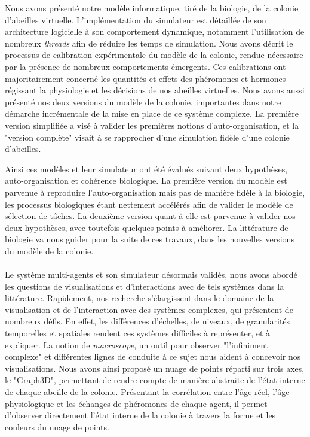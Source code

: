 Nous avons présenté notre modèle informatique, tiré de la biologie, de la colonie d'abeilles virtuelle. L'implémentation du simulateur est détaillée de son architecture logicielle à son comportement dynamique, notamment l'utilisation de nombreux \textit{threads} afin de réduire les temps de simulation. Nous avons décrit le processus de calibration expérimentale du modèle de la colonie, rendue nécessaire par la présence de nombreux comportements émergents. Ces calibrations ont majoritairement concerné les quantités et effets des phéromones et hormones régissant la physiologie et les décisions de nos abeilles virtuelles. Nous avons aussi présenté nos deux versions du modèle de la colonie, importantes dans notre démarche incrémentale de la mise en place de ce système complexe. La première version simplifiée a visé à valider les premières notions d'auto-organisation, et la "version complète" visait à se rapprocher d'une simulation fidèle d'une colonie d'abeilles.

Ainsi ces modèles et leur simulateur ont été évalués suivant deux hypothèses, auto-organisation et cohérence biologique. La première version du modèle est parvenue à reproduire l'auto-organisation mais pas de manière fidèle à la biologie, les processus biologiques étant nettement accélérés afin de valider le modèle de sélection de tâches. La deuxième version quant à elle est parvenue à valider nos deux hypothèses, avec toutefois quelques points à améliorer. La littérature de biologie va nous guider pour la suite de ces travaux, dans les nouvelles versions du modèle de la colonie.

\paragraph{}

Le système multi-agents et son simulateur désormais validés, nous avons abordé les questions de visualisations et d'interactions avec de tels systèmes dans la littérature. Rapidement, nos recherche s'élargissent dans le domaine de la visualisation et de l'interaction avec des systèmes complexes, qui présentent de nombreux défis. En effet, les différences d'échelles, de niveaux, de granularités temporelles et spatiales rendent ces systèmes difficiles à représenter, et à expliquer. La notion de \textit{macroscope}, un outil pour observer "l'infiniment complexe" et différentes lignes de conduite à ce sujet nous aident à concevoir nos visualisations. Nous avons ainsi proposé un nuage de points réparti sur trois axes, le "Graph3D", permettant de rendre compte de manière abstraite de l'état interne de chaque abeille de la colonie. Présentant la corrélation entre l'âge réel, l'âge physiologique et les échanges de phéromones de chaque agent, il permet d'observer directement l'état interne de la colonie à travers la forme et les couleurs du nuage de points.

